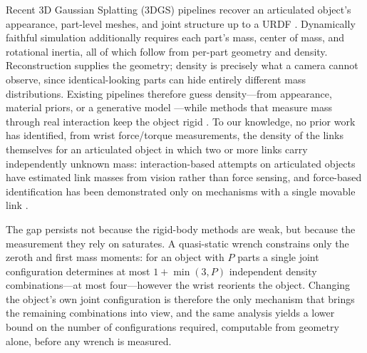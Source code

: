 Recent 3D Gaussian Splatting (3DGS) pipelines recover an articulated object's appearance, part-level meshes, and joint structure up to a URDF \cite{lee2026rora}. Dynamically faithful simulation additionally requires each part's mass, center of mass, and rotational inertia, all of which follow from per-part geometry and density. Reconstruction supplies the geometry; density is precisely what a camera cannot observe, since identical-looking parts can hide entirely different mass distributions. Existing pipelines therefore guess density---from appearance, material priors, or a generative model \cite{shuai2025pugs,chopra2026physgs,cao2026physxomni}---while methods that measure mass through real interaction keep the object rigid \cite{pfaff2025scalable,nadeau2023sum}. To our knowledge, no prior work has identified, from wrist force/torque measurements, the density of the links themselves for an articulated object in which two or more links carry independently unknown mass: interaction-based attempts on articulated objects have estimated link masses from vision rather than force sensing, and force-based identification has been demonstrated only on mechanisms with a single movable link \cite{he2027rigpi}.

The gap persists not because the rigid-body methods are weak, but because the measurement they rely on saturates. A quasi-static wrench constrains only the zeroth and first mass moments: for an object with $P$ parts a single joint configuration determines at most $1+\min(3,P)$ independent density combinations---at most four---however the wrist reorients the object. Changing the object's own joint configuration is therefore the only mechanism that brings the remaining combinations into view, and the same analysis yields a lower bound on the number of configurations required, computable from geometry alone, before any wrench is measured.

